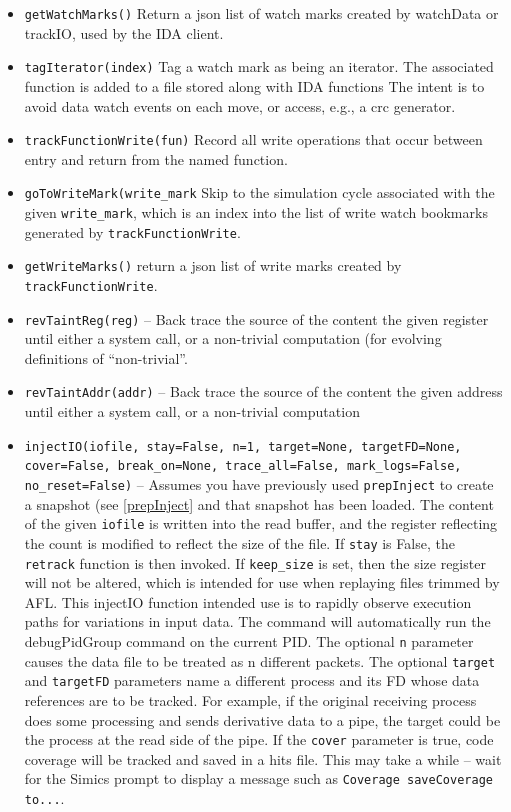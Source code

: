 \documentclass[titlepage]{article}
\begin{document}
\begin{itemize}
\item {\tt getWatchMarks()} Return a json list of watch marks created by watchData or trackIO, used by the IDA client.

\item {\tt tagIterator(index)} Tag a watch mark as being an iterator.  The associated function is added to a file stored along with IDA functions
The intent is to avoid data watch events on each move, or access, e.g., a crc generator.

\item {\tt trackFunctionWrite(fun)} Record all write operations that occur between entry and return from the named function.

\item {\tt goToWriteMark(write\_mark} Skip to the simulation cycle associated with the given {\tt write\_mark}, which is an index into the list of 
write watch bookmarks generated by {\tt trackFunctionWrite}.

\item {\tt getWriteMarks()} return a json list of write marks created by {\tt trackFunctionWrite}.

\item {\tt revTaintReg(reg)} – Back trace the source of the content the given register until either a system call, or a non-trivial computation (for evolving definitions of “non-trivial”.  

\item {\tt revTaintAddr(addr)} -- Back trace the source of the content the given address until either a system call, or a non-trivial computation

\item {\tt injectIO(iofile, stay=False, n=1, target=None, targetFD=None, cover=False, break\_on=None, trace\_all=False, mark\_logs=False, no\_reset=False)} -- Assumes you have previously used {\tt prepInject}
to create a snapshot (see \ref{prepInject} and that snapshot has been loaded.
The content of the given {\tt iofile} is written into the read buffer, and the register reflecting 
the count is modified to reflect the size of the file.  If {\tt stay} is False, the {\tt retrack} function is then invoked. If {\tt keep\_size} is
set, then the size register will not be altered, which is intended for use when replaying files trimmed by AFL.
This injectIO function intended use is to rapidly observe execution paths for variations in input data. The command will automatically
run the debugPidGroup command on the current PID. The optional {\tt n} parameter causes the data file to be treated as n different packets.
The optional {\tt target} and {\tt targetFD} parameters name a different process and its FD whose data references are to be tracked.  For example,
if the original receiving process does some processing and sends derivative data to a pipe, the target could be the process at the read side
of the pipe.  If the {\tt cover} parameter is true, code coverage will be tracked and saved in a hits file.  This may take a while -- wait for the
Simics prompt to display a message such as {\tt Coverage saveCoverage to...}.


\end{itemize}
\end{document}
